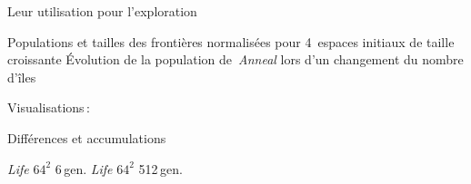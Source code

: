 \documentclass[a4paper,dvips]{slides}
\renewcommand{\arule}[1]{\emph{\mbox{#1}}} %
\renewcommand{\asquare}[1]{\ensuremath{#1^{2}}}
\newcommand{\agencnt}[1]{#1\,gen.}
\newenvironment{mynote}{\begin{note}\begin{scriptsize}}{\end{scriptsize}\end{note}}
\newcommand{\mytitle}[1]{\begin{center}\begin{large}#1\end{large}\end{center}}
\newcommand{\mystitle}[1]{\begin{center}#1\end{center}}
\begin{document}


\begin{slide}
  \mystitle{Leur utilisation pour l'exploration}
  {Populations et tailles des fronti\`eres normalis\'ees pour 4~espaces
    initiaux de taille crois\-sante}%
  {\'Evolution de la population de~\arule{Anneal} lors
    d'un changement du nombre d'\^iles}%
\end{slide}




\begin{slide}
  \mytitle{Visualisations\,:}
  \mystitle{Diff\'erences et accumulations}
  {\arule{Life} \asquare{64} \agencnt{6}}
  {\arule{Life} \asquare{64} \agencnt{512}}
\end{slide}
\end{document}
